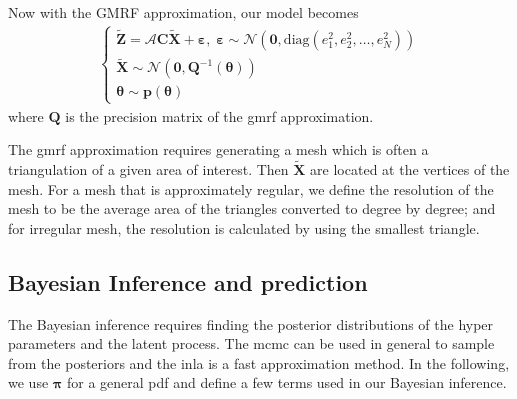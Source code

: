 \documentclass[a4paper,12pt]{article}
\begin{document}
Now with the GMRF approximation, our model becomes
\begin{align}
\left\{ \begin{array}{l}
\bm{\tilde{Z}} = \bm{\mathcal{A}}\bm{C}\bm{\tilde{X}} + \bm{\varepsilon}, \; 
\bm{\varepsilon} \sim \mathcal{N} (\bm{0}, \mbox{diag}(e_1^2, e_2^2, \dots, e_N^2)) \\
\bm{\tilde{X}} \sim \mathcal{N}(\bm{0}, \bm{Q}^{-1}(\bm{\theta})) \\
\bm{\theta} \sim \bm{p}(\bm{\theta})
\end{array} \right.
\end{align}
where $\bm{Q}$ is the precision matrix of the \acrshort{gmrf} approximation.

The \acrshort{gmrf} approximation requires generating a \gls{mesh} which is often a triangulation of a given area of interest. Then $\bm{\tilde{X}}$ are located at the vertices of the mesh. For a mesh that is approximately regular, we define the resolution of the mesh to be the average area of the triangles converted to degree by degree; and for irregular mesh, the resolution is calculated by using the smallest triangle.

\subsection{Bayesian Inference and prediction}
The Bayesian inference requires finding the posterior distributions of the hyper parameters and the latent process. The \acrfull{mcmc} can be used in general to sample from the posteriors and the \acrfull{inla} is a fast approximation method. In the following, we use $\bm{\pi}$ for a general \acrshort{pdf} and define a few terms used in our Bayesian inference.
\end{document}
